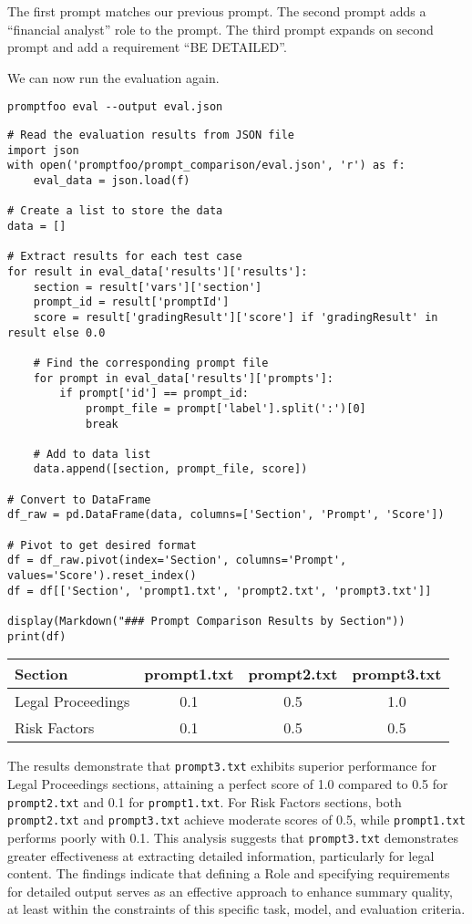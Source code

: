 The first prompt matches our previous prompt. The second prompt adds a ``financial analyst'' role to the prompt. The third prompt expands on second prompt and add a requirement ``BE DETAILED''.

We can now run the evaluation again.

\begin{verbatim}
promptfoo eval --output eval.json
\end{verbatim}

\begin{verbatim}
# Read the evaluation results from JSON file
import json
with open('promptfoo/prompt_comparison/eval.json', 'r') as f:
    eval_data = json.load(f)

# Create a list to store the data
data = []

# Extract results for each test case
for result in eval_data['results']['results']:
    section = result['vars']['section']
    prompt_id = result['promptId']
    score = result['gradingResult']['score'] if 'gradingResult' in result else 0.0
    
    # Find the corresponding prompt file
    for prompt in eval_data['results']['prompts']:
        if prompt['id'] == prompt_id:
            prompt_file = prompt['label'].split(':')[0]
            break
            
    # Add to data list
    data.append([section, prompt_file, score])

# Convert to DataFrame
df_raw = pd.DataFrame(data, columns=['Section', 'Prompt', 'Score'])

# Pivot to get desired format
df = df_raw.pivot(index='Section', columns='Prompt', values='Score').reset_index()
df = df[['Section', 'prompt1.txt', 'prompt2.txt', 'prompt3.txt']]

display(Markdown("### Prompt Comparison Results by Section"))
print(df)
\end{verbatim}

\begin{table}[h]
\centering
\begin{tabular}{lccc}
\hline
Section & prompt1.txt & prompt2.txt & prompt3.txt \\
\hline
Legal Proceedings & 0.1 & 0.5 & 1.0 \\
Risk Factors & 0.1 & 0.5 & 0.5 \\
\hline
\end{tabular}
\end{table}

The results demonstrate that \texttt{prompt3.txt} exhibits superior performance for Legal Proceedings sections, attaining a perfect score of 1.0 compared to 0.5 for \texttt{prompt2.txt} and 0.1 for \texttt{prompt1.txt}. For Risk Factors sections, both \texttt{prompt2.txt} and \texttt{prompt3.txt} achieve moderate scores of 0.5, while \texttt{prompt1.txt} performs poorly with 0.1. This analysis suggests that \texttt{prompt3.txt} demonstrates greater effectiveness at extracting detailed information, particularly for legal content. The findings indicate that defining a Role and specifying requirements for detailed output serves as an effective approach to enhance summary quality, at least within the constraints of this specific task, model, and evaluation criteria.

